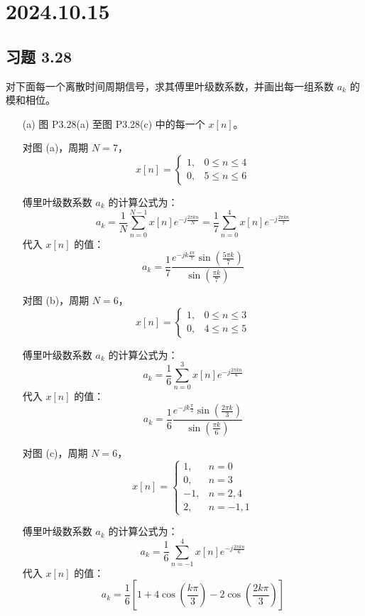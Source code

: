 \documentclass[UTF8]{report}
\theoremstyle{MyLineTheoremStyle} %
\theoremstyle{MyBlockTheoremStyle} %
\theoremstyle{MySubsubsectionStyle} %
\begin{document}
\chapter{2024.10.15}\thispagestyle{fancy}


\section{习题 3.28}

对下面每一个离散时间周期信号，求其傅里叶级数系数，并画出每一组系数 $a_k$ 的模和相位。

\begin{itemize}
    \item[(a)] 图 P3.28(a) 至图 P3.28(c) 中的每一个 $x[n]$。

对图 (a)，周期 $N = 7$，
\[ 
x[n] = \begin{cases}
    1, & 0 \leq n \leq 4 \\
    0, & 5 \leq n \leq 6
\end{cases}
\]

傅里叶级数系数 $a_k$ 的计算公式为：
\[
a_k = \frac{1}{N} \sum_{n=0}^{N-1} x[n] e^{-j \frac{2\pi k n}{N}} = \frac{1}{7} \sum_{n=0}^{4} x[n] e^{-j \frac{2\pi k n}{7}}
\]
代入 $x[n]$ 的值：
\[
a_k = \frac{1}{7} \frac{e^{-jk\frac{4\pi}{7}} \sin\left(\frac{5\pi k}{7}\right)}{\sin\left(\frac{\pi k}{7}\right)}
\]

对图 (b)，周期 $N = 6$，
\[ 
x[n] = \begin{cases}
    1, & 0 \leq n \leq 3 \\
    0, & 4 \leq n \leq 5
\end{cases}
\]

傅里叶级数系数 $a_k$ 的计算公式为：
\[
a_k = \frac{1}{6} \sum_{n=0}^{3} x[n] e^{-j \frac{2\pi k n}{6}}
\]
代入 $x[n]$ 的值：
\[
a_k = \frac{1}{6} \frac{e^{-jk\frac{\pi}{2}} \sin\left(\frac{2\pi k}{3}\right)}{\sin\left(\frac{\pi k}{6}\right)}
\]

对图 (c)，周期 $N = 6$，
\[ 
x[n] = \begin{cases}
    1, & n = 0 \\
    0, & n = 3 \\
    -1, & n = 2, 4 \\
    2, & n = -1, 1
\end{cases}
\]

傅里叶级数系数 $a_k$ 的计算公式为：
\[
a_k = \frac{1}{6} \sum_{n=-1}^{4} x[n] e^{-j \frac{2\pi k n}{6}}
\]
代入 $x[n]$ 的值：
\[
a_k = \frac{1}{6} \left[ 1 + 4\cos\left(\frac{k\pi}{3}\right) - 2\cos\left(\frac{2k\pi}{3}\right) \right]
\]










\end{itemize}
\end{document}
